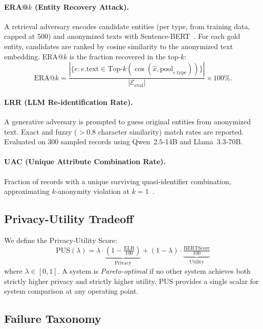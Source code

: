 \documentclass[10pt,twocolumn]{article}
\begin{document}
\paragraph{ERA@$k$ (Entity Recovery Attack).}
A retrieval adversary encodes candidate entities (per type, from training data, capped at 500) and anonymized texts with Sentence-BERT~\citep{reimers2019}.
For each gold entity, candidates are ranked by cosine similarity to the anonymized text embedding.
ERA@$k$ is the fraction recovered in the top-$k$:
\begin{equation}
\text{ERA@}k = \frac{|\{e : e.\text{text} \in \text{Top-}k(\cos(\hat{x}, \text{pool}_{e.\text{type}}))\}|}{|\mathcal{E}_{\text{eval}}|} \times 100\%.
\end{equation}

\paragraph{LRR (LLM Re-identification Rate).}
A generative adversary is prompted to guess original entities from anonymized text.
Exact and fuzzy ($>0.8$ character similarity) match rates are reported.
Evaluated on 300 sampled records using Qwen~2.5-14B and Llama~3.3-70B.

\paragraph{UAC (Unique Attribute Combination Rate).}
Fraction of records with a unique surviving quasi-identifier combination, approximating $k$-anonymity violation at $k\!=\!1$~\citep{sweeney2002}.

\subsection{Privacy-Utility Tradeoff}

We define the Privacy-Utility Score:
\begin{equation}
\text{PUS}(\lambda) = \lambda \cdot \underbrace{\left(1 - \tfrac{\text{ELR}}{100}\right)}_{\text{Privacy}} + (1-\lambda) \cdot \underbrace{\tfrac{\text{BERTScore}}{100}}_{\text{Utility}}
\end{equation}
where $\lambda \in [0,1]$.
A system is \emph{Pareto-optimal} if no other system achieves both strictly higher privacy and strictly higher utility.
PUS provides a single scalar for system comparison at any operating point.

\subsection{Failure Taxonomy}
\end{document}

